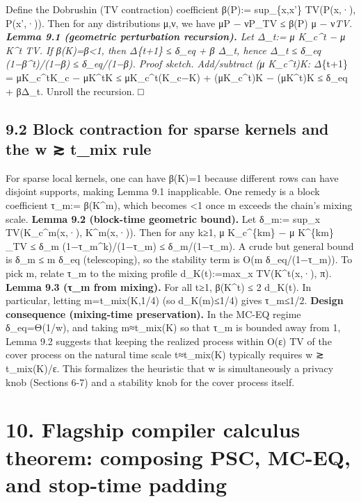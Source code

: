 \documentclass[11pt]{article}
\begin{document}
Define the Dobrushin (TV contraction) coefficient β(P):= sup\_\{x,x'\}
TV(P(x,·), P(x',·)). Then for any distributions μ,ν, we have
\textbar\textbar μP − νP\textbar\textbar\_TV ≤ β(P) \textbar\textbar μ −
ν\textbar\textbar{}\emph{TV. \textbf{Lemma 9.1 (geometric perturbation
recursion).} Let Δ\_t:= \textbar\textbar{} μ K\_c\^{}t − μ K\^{}t
\textbar\textbar{}\emph{TV. If β(K)=β\textless1, then Δ}\{t+1\} ≤ δ\_eq
+ β Δ\_t, hence Δ\_t ≤ δ\_eq (1−β\^{}t)/(1−β) ≤ δ\_eq/(1−β). \emph{Proof
sketch.} Add/subtract (μ K\_c\^{}t)K: Δ}\{t+1\} =
\textbar\textbar μK\_c\^{}tK\_c − μK\^{}tK\textbar\textbar{} ≤
\textbar\textbar μK\_c\^{}t(K\_c−K)\textbar\textbar{} +
\textbar\textbar(μK\_c\^{}t)K − (μK\^{}t)K\textbar\textbar{} ≤ δ\_eq +
βΔ\_t. Unroll the recursion. □

\hypertarget{block-contraction-for-sparse-kernels-and-the-w-t_mix-rule}{%
\subsection{9.2 Block contraction for sparse kernels and the w ≳ t\_mix
rule}\label{block-contraction-for-sparse-kernels-and-the-w-t_mix-rule}}

For sparse local kernels, one can have β(K)=1 because different rows can
have disjoint supports, making Lemma 9.1 inapplicable. One remedy is a
block coefficient τ\_m:= β(K\^{}m), which becomes \textless1 once m
exceeds the chain's mixing scale. \textbf{Lemma 9.2 (block-time
geometric bound).} Let δ\_m:= sup\_x TV(K\_c\^{}m(x,·), K\^{}m(x,·)).
Then for any k≥1, \textbar\textbar{} μ K\_c\^{}\{km\} − μ K\^{}\{km\}
\textbar\textbar\_TV ≤ δ\_m (1−τ\_m\^{}k)/(1−τ\_m) ≤ δ\_m/(1−τ\_m). A
crude but general bound is δ\_m ≤ m δ\_eq (telescoping), so the
stability term is O(m δ\_eq/(1−τ\_m)). To pick m, relate τ\_m to the
mixing profile d\_K(t):=max\_x TV(K\^{}t(x,·), π). \textbf{Lemma 9.3
(τ\_m from mixing).} For all t≥1, β(K\^{}t) ≤ 2 d\_K(t). In particular,
letting m=t\_mix(K,1/4) (so d\_K(m)≤1/4) gives τ\_m≤1/2. \textbf{Design
consequence (mixing-time preservation).} In the MC-EQ regime
δ\_eq=Θ(1/w), and taking m≈t\_mix(K) so that τ\_m is bounded away from
1, Lemma 9.2 suggests that keeping the realized process within O(ε) TV
of the cover process on the natural time scale t≈t\_mix(K) typically
requires w ≳ t\_mix(K)/ε. This formalizes the heuristic that w is
simultaneously a privacy knob (Sections 6-7) and a stability knob for
the cover process itself.

\hypertarget{flagship-compiler-calculus-theorem-composing-psc-mc-eq-and-stop-time-padding}{%
\section{10. Flagship compiler calculus theorem: composing PSC, MC-EQ,
and stop-time
padding}\label{flagship-compiler-calculus-theorem-composing-psc-mc-eq-and-stop-time-padding}}
\end{document}
